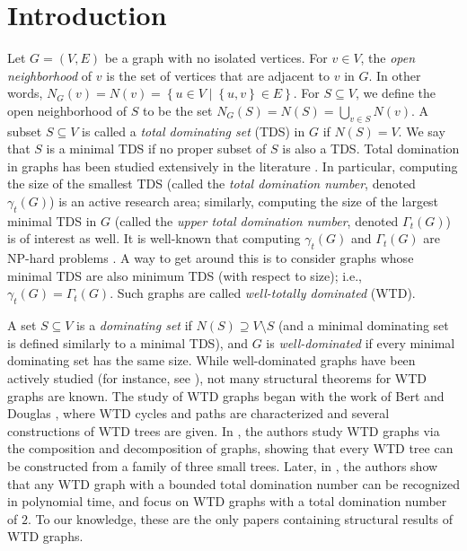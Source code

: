 \documentclass[12pt, reqno]{amsart}
\theoremstyle{definition}
\theoremstyle{plain}
\theoremstyle{definition}
\newcommand\Set[2]{\left\lbrace #1 \mid #2 \right\rbrace}
\newcommand\set[1]{\left\lbrace #1 \right\rbrace}
\begin{document}
\maketitle
\setcounter{tocdepth}{1}

\section{Introduction}

Let $G = (V,E)$ be a graph with no isolated vertices.
For $v \in V$, the \emph{open neighborhood} of $v$ is the set of vertices that are adjacent to $v$ in $G$.
In other words,
$N_G(v) = N(v) = \Set{u \in V}{ \set{u,v} \in E}$.
For $S \subseteq V$, we define the open neighborhood of $S$ to be the set
$N_G(S) = N(S) = \bigcup_{v \in S}N(v)$.
A subset $S \subseteq V$ is called a \emph{total dominating set} (TDS) in $G$ if $N(S) = V$.
We say that $S$ is a minimal TDS if no proper subset of $S$ is also a TDS.
Total domination in graphs has been studied extensively in the literature \cite{TDinG}.
In particular, computing the size of the smallest TDS (called the \emph{total domination number}, denoted $\gamma_t(G)$) is an active research area; similarly, computing the size of the largest minimal TDS in $G$ (called the \emph{upper total domination number}, denoted $\Gamma_t(G)$) is of interest as well.
It is well-known that computing $\gamma_t(G)$ and $\Gamma_t(G)$ are NP-hard problems \cite{pfaff1984np,MR2043923}.
A way to get around this is to consider graphs whose minimal TDS are also minimum TDS (with respect to size); i.e., $\gamma_t(G) = \Gamma_t(G)$.
Such graphs are called \emph{well-totally dominated} (WTD).

A set $S \subseteq V$ is a \emph{dominating set} if $N(S)\supseteq V\setminus S$ (and a minimal dominating set is defined similarly to a minimal TDS), and $G$ is \emph{well-dominated} if every minimal dominating set has the same size.
While well-dominated graphs have been actively studied (for instance, see \cite{MR4197372,MR1220599,MR3648208,MR4699495}), not many structural theorems for WTD graphs are known.
The study of WTD graphs began with the work of Bert and Douglas \cite{MR1605080}, where WTD cycles and paths are characterized and several constructions of WTD trees are given.
In \cite{finbow2009total}, the authors study WTD graphs via the composition and decomposition of graphs, showing that every WTD tree can be constructed from a family of three small trees.
Later, in \cite{MR4333882}, the authors show that any WTD graph with a bounded total domination number can be recognized in polynomial time, and focus on WTD graphs with a total domination number of $2$.
To our knowledge, these are the only papers containing structural results of WTD graphs.
\end{document}
